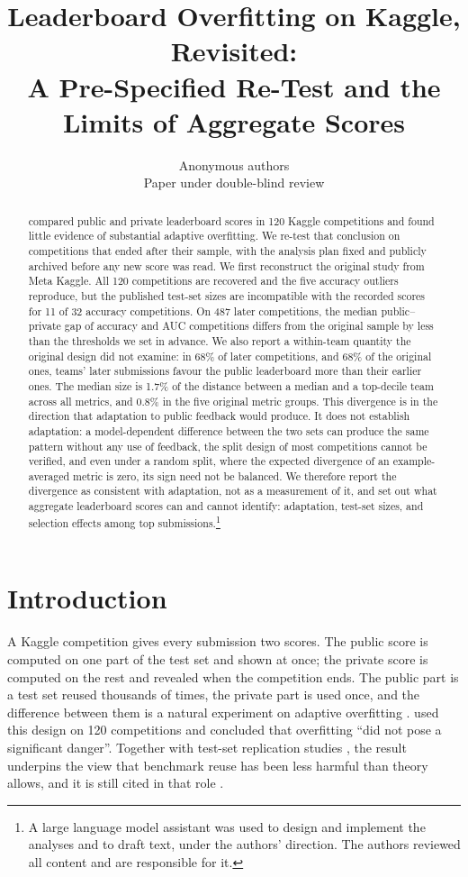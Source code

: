 \documentclass[10pt]{article}
\title{Leaderboard Overfitting on Kaggle, Revisited:\\ A Pre-Specified Re-Test and the Limits of Aggregate Scores}
\author{\name Anonymous authors \\ \addr Paper under double-blind review}
\begin{document}
\maketitle

\begin{abstract}
\citet{roelofs2019meta} compared public and private leaderboard scores in 120 Kaggle competitions and found little evidence of substantial adaptive overfitting. We re-test that conclusion on competitions that ended after their sample, with the analysis plan fixed and publicly archived before any new score was read. We first reconstruct the original study from Meta Kaggle. All 120 competitions are recovered and the five accuracy outliers reproduce, but the published test-set sizes are incompatible with the recorded scores for 11 of 32 accuracy competitions. On 487 later competitions, the median public--private gap of accuracy and AUC competitions differs from the original sample by less than the thresholds we set in advance. We also report a within-team quantity the original design did not examine: in 68\% of later competitions, and 68\% of the original ones, teams' later submissions favour the public leaderboard more than their earlier ones. The median size is 1.7\% of the distance between a median and a top-decile team across all metrics, and 0.8\% in the five original metric groups. This divergence is in the direction that adaptation to public feedback would produce. It does not establish adaptation: a model-dependent difference between the two sets can produce the same pattern without any use of feedback, the split design of most competitions cannot be verified, and even under a random split, where the expected divergence of an example-averaged metric is zero, its sign need not be balanced. We therefore report the divergence as consistent with adaptation, not as a measurement of it, and set out what aggregate leaderboard scores can and cannot identify: adaptation, test-set sizes, and selection effects among top submissions.\footnote{A large language model assistant was used to design and implement the analyses and to draft text, under the authors' direction. The authors reviewed all content and are responsible for it.}
\end{abstract}

\section{Introduction}

A Kaggle competition gives every submission two scores. The public score is computed on one part of the test set and shown at once; the private score is computed on the rest and revealed when the competition ends. The public part is a test set reused thousands of times, the private part is used once, and the difference between them is a natural experiment on adaptive overfitting \citep{dwork2015reusable,blum2015ladder}. \citet{roelofs2019meta} used this design on 120 competitions and concluded that overfitting ``did not pose a significant danger''. Together with test-set replication studies \citep{recht2019imagenet,yadav2019cold}, the result underpins the view that benchmark reuse has been less harmful than theory allows, and it is still cited in that role \citep{sculley2025position}.
\end{document}

